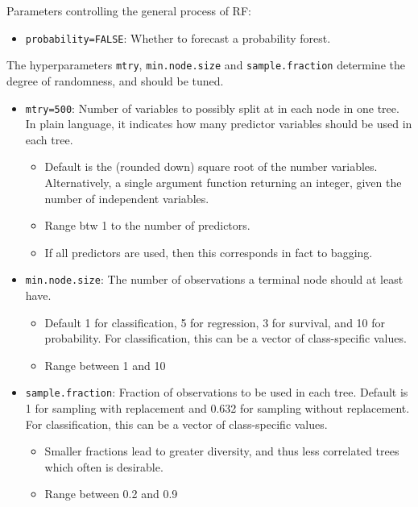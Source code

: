 \documentclass[
  a4paper,
  twoside,
  openright]{book}
\providecommand{\tightlist}{%
  \setlength{\itemsep}{0pt}\setlength{\parskip}{0pt}}
\theoremstyle{definition}
\theoremstyle{definition}
\theoremstyle{definition}
\theoremstyle{definition}
\theoremstyle{remark}
\begin{document}
Parameters controlling the general process of RF:

\begin{itemize}
\tightlist
\item
  \texttt{probability=FALSE}: Whether to forecast a probability forest.
\end{itemize}

The hyperparameters \texttt{mtry}, \texttt{min.node.size} and \texttt{sample.fraction} determine the degree of randomness, and should be tuned.

\begin{itemize}
\tightlist
\item
  \texttt{mtry=500}: Number of variables to possibly split at in each node in one tree. In plain language, it indicates how many predictor variables should be used in each tree.

  \begin{itemize}
  \tightlist
  \item
    Default is the (rounded down) square root of the number variables. Alternatively, a single argument function returning an integer, given the number of independent variables.
  \item
    Range btw 1 to the number of predictors.
  \item
    If all predictors are used, then this corresponds in fact to bagging.
  \end{itemize}
\item
  \texttt{min.node.size}: The number of observations a terminal node should at least have.

  \begin{itemize}
  \tightlist
  \item
    Default 1 for classification, 5 for regression, 3 for survival, and 10 for probability. For classification, this can be a vector of class-specific values.
  \item
    Range between 1 and 10
  \end{itemize}
\item
  \texttt{sample.fraction}: Fraction of observations to be used in each tree. Default is 1 for sampling with replacement and 0.632 for sampling without replacement. For classification, this can be a vector of class-specific values.

  \begin{itemize}
  \tightlist
  \item
    Smaller fractions lead to greater diversity, and thus less correlated trees which often is desirable.
  \item
    Range between 0.2 and 0.9
  \end{itemize}
\end{itemize}
\end{document}
